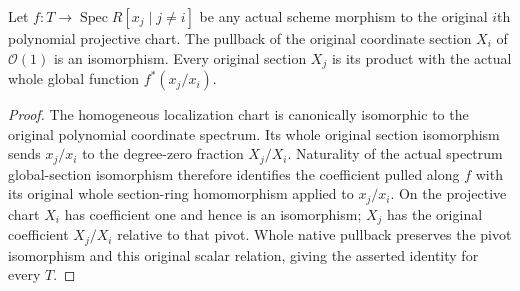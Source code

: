 \begin{lemma}
\label{lem:fc-original-projective-chart-section-ratios}
\leanok
{}
Let $f:T\to\operatorname{Spec}R[x_j\mid j\ne i]$ be any actual scheme
morphism to the original $i$th polynomial projective chart. The pullback
of the original coordinate section $X_i$ of $\mathcal O(1)$ is an
isomorphism. Every original section $X_j$ is its product with the actual
whole global function $f^*(x_j/x_i)$.
\end{lemma}
\begin{proof}
The homogeneous localization chart is canonically isomorphic to the
original polynomial coordinate spectrum. Its whole original section
isomorphism sends $x_j/x_i$ to the degree-zero fraction $X_j/X_i$.
Naturality of the actual spectrum global-section isomorphism therefore
identifies the coefficient pulled along $f$ with its original whole
section-ring homomorphism applied to $x_j/x_i$. On the projective chart
$X_i$ has coefficient one and hence is an isomorphism; $X_j$ has the
original coefficient $X_j/X_i$ relative to that pivot. Whole native
pullback preserves the pivot isomorphism and this original scalar
relation, giving the asserted identity for every $T$.
\end{proof}
